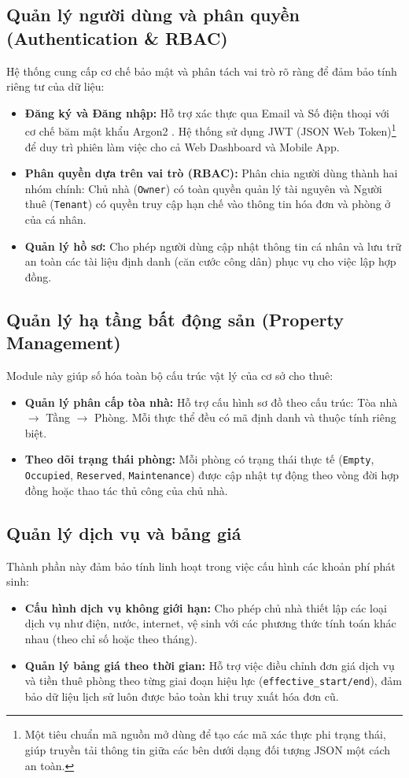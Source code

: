 \subsection{Quản lý người dùng và phân quyền (Authentication \& RBAC)}
Hệ thống cung cấp cơ chế bảo mật và phân tách vai trò rõ ràng để đảm bảo tính riêng tư của dữ liệu:
\begin{itemize}
    \item \textbf{Đăng ký và Đăng nhập:} Hỗ trợ xác thực qua Email và Số điện thoại với cơ chế băm mật khẩu Argon2 \cite{Argon2}. Hệ thống sử dụng JWT (JSON Web Token)\footnote{Một tiêu chuẩn mã nguồn mở dùng để tạo các mã xác thực phi trạng thái, giúp truyền tải thông tin giữa các bên dưới dạng đối tượng JSON một cách an toàn.} \cite{RFC7519} để duy trì phiên làm việc cho cả Web Dashboard và Mobile App.
    \item \textbf{Phân quyền dựa trên vai trò (RBAC):} Phân chia người dùng thành hai nhóm chính: Chủ nhà (\texttt{Owner}) có toàn quyền quản lý tài nguyên và Người thuê (\texttt{Tenant}) có quyền truy cập hạn chế vào thông tin hóa đơn và phòng ở của cá nhân.
    \item \textbf{Quản lý hồ sơ:} Cho phép người dùng cập nhật thông tin cá nhân và lưu trữ an toàn các tài liệu định danh (căn cước công dân) phục vụ cho việc lập hợp đồng.
\end{itemize}

\subsection{Quản lý hạ tầng bất động sản (Property Management)}
Module này giúp số hóa toàn bộ cấu trúc vật lý của cơ sở cho thuê:
\begin{itemize}
    \item \textbf{Quản lý phân cấp tòa nhà:} Hỗ trợ cấu hình sơ đồ theo cấu trúc: Tòa nhà $\rightarrow$ Tầng $\rightarrow$ Phòng. Mỗi thực thể đều có mã định danh và thuộc tính riêng biệt.
    \item \textbf{Theo dõi trạng thái phòng:} Mỗi phòng có trạng thái thực tế (\texttt{Empty}, \texttt{Occupied}, \texttt{Reserved}, \texttt{Maintenance}) được cập nhật tự động theo vòng đời hợp đồng hoặc thao tác thủ công của chủ nhà.
\end{itemize}

\subsection{Quản lý dịch vụ và bảng giá}
Thành phần này đảm bảo tính linh hoạt trong việc cấu hình các khoản phí phát sinh:
\begin{itemize}
    \item \textbf{Cấu hình dịch vụ không giới hạn:} Cho phép chủ nhà thiết lập các loại dịch vụ như điện, nước, internet, vệ sinh với các phương thức tính toán khác nhau (theo chỉ số hoặc theo tháng).
    \item \textbf{Quản lý bảng giá theo thời gian:} Hỗ trợ việc điều chỉnh đơn giá dịch vụ và tiền thuê phòng theo từng giai đoạn hiệu lực (\texttt{effective\_start/end}), đảm bảo dữ liệu lịch sử luôn được bảo toàn khi truy xuất hóa đơn cũ.
\end{itemize}

